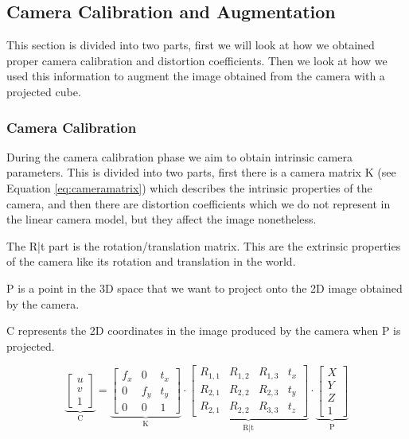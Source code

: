 \subsection{Camera Calibration and Augmentation}

This section is divided into two parts, first we will look at how we obtained proper camera calibration and distortion coefficients. Then we look at how we used this information to augment the image obtained from the camera with a projected cube.

\subsubsection{Camera Calibration}

During the camera calibration phase we aim to obtain intrinsic camera parameters. This is divided into two parts, first there is a camera matrix K (see Equation \ref{eq:cameramatrix}) which describes the intrinsic properties of the camera, and then there are distortion coefficients which we do not represent in the linear camera model, but they affect the image nonetheless. 

The R|t part is the rotation/translation matrix. This are the extrinsic properties of the camera like its rotation and translation in the world.

P is a point in the 3D space that we want to project onto the 2D image obtained by the camera. 

C represents the 2D coordinates in the image produced by the camera when P is projected.

\begin{equation}
	\underbrace{
		\begin{bmatrix}
			u \\
			v \\
			1
		\end{bmatrix}
	}_\text{C}
	=
	\underbrace{
		\begin{bmatrix}
			f_{x} & 0 & t_{x} \\
			0 & f_{y} & t_{y} \\
			0 & 0 & 1
		\end{bmatrix}
	}_\text{K}
	\cdot
	\underbrace{
		\begin{bmatrix}
			R_{1,1} & R_{1,2} & R_{1,3} & t_{x} \\
			R_{2,1} & R_{2,2} & R_{2,3} & t_{y} \\
			R_{2,1} & R_{2,2} & R_{3,3} & t_{z}
		\end{bmatrix}
	}_\text{R|t}
	\cdot
	\underbrace{
		\begin{bmatrix}
			X \\
			Y \\
			Z \\
			1
		\end{bmatrix}
	}_\text{P}
	\label{eq:cameramatrix}
\end{equation}

